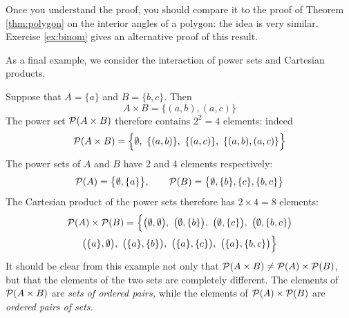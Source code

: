 Once you understand the proof, you should compare it to the proof of Theorem \ref{thm:polygon} on the interior angles of a polygon: the idea is very similar. Exercise \ref{ex:binom} gives an alternative proof of this result.\par

As a final example, we consider the interaction of power sets and Cartesian products.

\begin{example}{}{}
	Suppose that $A=\{a\}$ and $B=\{b,c\}$. Then
	\[
		A\times B=\{(a,b),(a,c)\}
	\]
	The power set $\mathcal{P}(A\times B)$ therefore contains $2^2=4$ elements: indeed
	\[
		\cP(A\times B)=\Big\{\emptyset,\ \{(a,b)\},\ \{(a,c)\},\ \{(a,b),(a,c)\}\Big\}
	\]
	The power sets of $A$ and $B$ have 2 and 4 elements respectively:
	\[
		\mathcal{P}(A)=\big\{\emptyset,\{a\}\big\},\qquad\mathcal{P}(B)=\big\{\emptyset,\{b\},\{c\},\{b,c\}\big\}
	\]
	The Cartesian product of the power sets therefore has $2\times 4=8$ elements:
	\begin{multline*}
		\mathcal{P}(A)\times\mathcal{P}(B)
		=\Big\{\big(\emptyset,\emptyset\big),\  \big(\emptyset,\{b\}\big),\  \big(\emptyset,\{c\}\big),\  \big(\emptyset,\{b,c\}\big)\\*
		\big(\{a\},\emptyset\big),\  \big(\{a\},\{b\}\big),\  \big(\{a\},\{c\}\big),\  \big(\{a\},\{b,c\}\big)\Big\}
	\end{multline*}
	It should be clear from this example not only that $\mathcal{P}(A\times B)\neq\mathcal{P}(A)\times\mathcal{P}(B)$, but that the elements of the two sets are completely different. The elements of $\mathcal{P}(A\times B)$ are \emph{sets of ordered pairs,} while the elements of $\mathcal{P}(A)\times\mathcal{P}(B)$ are \emph{ordered pairs of sets.}
\end{example}



% 


